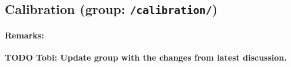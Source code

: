 \documentclass[landscape,a4paper]{article} %
\newcommand{\inl}[1]{\lstinline[columns=fixed]{#1}}
\newcommand{\inlvar}[1]{{\ttfamily#1}}
\begin{document}
\subsection{Calibration (group: \inl{/calibration/})}

\begin{multicols}{2}
\paragraph{Remarks:}
\textbf{TODO Tobi: Update group with the changes from latest discussion.}

%
%
\end{multicols}
\end{document}
